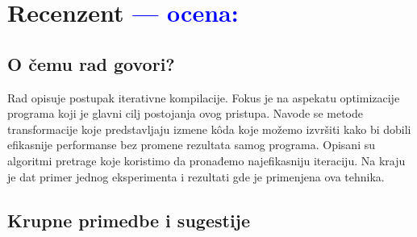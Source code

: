 \documentclass[a4paper]{report}
\newcommand{\odgovor}[1]{\textcolor{blue}{#1}}
\begin{document}
\chapter{Recenzent \odgovor{--- ocena:} }


\section{O čemu rad govori?}
Rad opisuje postupak iterativne kompilacije. Fokus je na aspekatu optimizacije programa koji je glavni cilj postojanja ovog pristupa. Navode se metode transformacije koje predstavljaju izmene kôda koje možemo izvršiti kako bi dobili efikasnije performanse bez promene rezultata samog programa. Opisani su algoritmi pretrage koje koristimo da pronađemo najefikasniju iteraciju. Na kraju je dat primer jednog eksperimenta i rezultati gde je primenjena ova tehnika.

\section{Krupne primedbe i sugestije}
\end{document}
